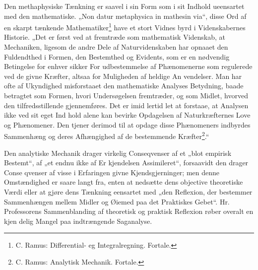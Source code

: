 \documentclass[12pt]{book}
\newcommand{\opage}[1]{\marginnote{\footnotesize\textit{[#1]}}}
\begin{document}
Den methaphysiske Tænkning er saavel i sin Form
som i sit Indhold ueensartet med den mathematiske.
„Non datur metaphysica in mathesin via“, disse Ord af
en skarpt tænkende Mathematiker\footnote{%
C. Ramus: Differential- eg Integralregning. Fortale.} have et stort Vidnes\-%
byrd i Videnskabernes Historie. „Det er først ved at
fremtræde som mathematisk Videnskab, at Mechaniken,
ligesom de andre Dele af Naturvidenskaben har opnaaet
den Fuldendthed i Formen, den Bestemthed og Evidents,
som er en nødvendig Betingelse for enhver sikker For\-%
udbestemmelse af Phænomenerne som regulerede ved de
givne Kræfter, altsaa for Muligheden af heldige An\-%
vendelser. Man har ofte af Ukyndighed misforstaaet den
mathematiske Analyses Betydning, baade betragtet som
Formen, hvori Undersøgelsen fremtræder, og som Midlet,
hvorved den tilfredsstillende gjennemføres. Det er imid\-%
lertid let at forstaae, at Analysen ikke ved sit eget Ind\-%
hold alene kan bevirke Opdagelsen af Naturkræfternes
Love og Phænomener. Den tjener derimod til at opdage
disse Phænomeners indbyrdes Sammenhæng og deres
Afhængighed af de bestemmende Kræfter\footnote{C. Ramus: Analytisk Mechanik. Fortale.}.“

Den analytiske Mechanik drager virkelig Conseqvenser
af et „blot empirisk Bestemt“, af „et endnu ikke af Er\-%
kjendelsen Assimileret“, forsaavidt den drager Conse\-%
qvenser af visse i Erfaringen givne Kjendsgjerninger; men
denne Omstændighed er saare langt fra, enten at nedsætte
dens objective theoretiske Værdi eller at gjøre dens
\opage{26}\setcounter{footnote}{0}%
Tænkning eensartet med „den Reflexion, der bestemmer
Sammenhængen mellem Midler og Øiemed paa det
Praktiskes Gebet“. Hr. Professorens Sammenblanding
af theoretisk og praktisk Reflexion røber overalt en kjen\-%
delig Mangel paa indtrængende Saganalyse.
\end{document}
